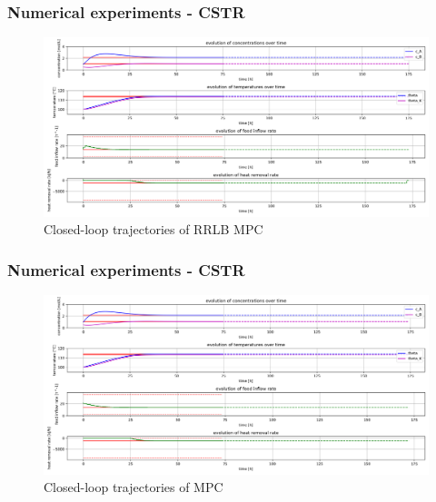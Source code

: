 \documentclass[10pt]{beamer}
\begin{document}
\begin{frame}
    \frametitle{Numerical experiments - CSTR}
    \begin{figure}[H]
        \centering
        \includegraphics[width=1.0\textwidth]{../cstr_package/rrlb_mpc.png}
        \caption*{Closed-loop trajectories of RRLB MPC}
    \end{figure}
\end{frame}

\begin{frame}
    \frametitle{Numerical experiments - CSTR}
    \begin{figure}[H]
        \centering
        \includegraphics[width=1.0\textwidth]{../cstr_package/mpc.png}
        \caption*{Closed-loop trajectories of MPC}
    \end{figure}
\end{frame}
\end{document}

